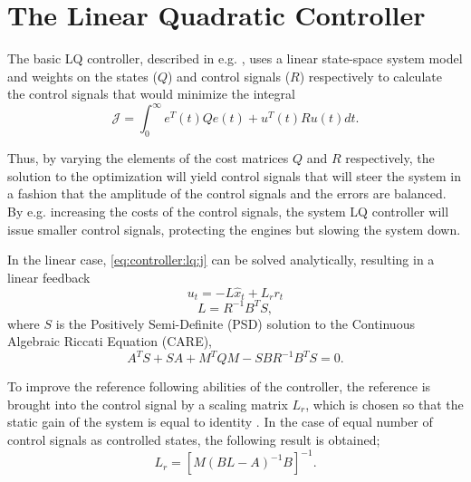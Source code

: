 \section{The Linear Quadratic Controller}
\label{sec:controller:lq}
    The basic LQ controller, described in e.g. \citep{glad2003reglerteori},
    uses a linear state-space system model and weights on the states ($Q$) and control
    signals ($R$) respectively to calculate the control signals that would
    minimize the integral
    \begin{equation}
    \label{eq:controller:lq:j}
        \mathcal{J} = \int_{0}^{\infty} e^{T}(t)Qe(t) + u^{T}(t)Ru(t) dt.
    \end{equation}

    Thus, by varying the elements of the cost matrices $Q$ and $R$
    respectively, the solution to the optimization will yield control
    signals that will steer the system in a fashion that the amplitude
    of the control signals and the errors are balanced.
    By e.g. increasing the costs of the control signals, the system
    LQ controller will issue smaller control signals, protecting the
    engines but slowing the system down.

    In the linear case, \eqref{eq:controller:lq:j} can be solved analytically,
    resulting in a linear feedback
    \begin{equation}
    \label{eq:controller:u}
        u_{t} = -L\hat{x}_{t} + L_{r}r_{t}
    \end{equation}
    \begin{equation}
    \label{eq:controller:L}
        L = R^{-1}B^{T}S,
    \end{equation}
    where $S$ is the Positively Semi-Definite (PSD) solution to the
    Continuous Algebraic Riccati Equation (CARE)\citep{glad2003reglerteori},
    \begin{equation}
        A^{T}S + SA + M^{T}QM - SBR^{-1}B^{T}S = 0.
    \end{equation}

    To improve the reference following abilities of the controller,
    the reference is brought into the control signal by a scaling
    matrix $L_{r}$, which is chosen so that the static gain of the
    system is equal to identity \citep{glad2003reglerteori}.
    In the case of equal number of control signals as controlled
    states, the following result is obtained;
    \begin{equation}
    \label{eq:controller:Lr}
        L_{r} = \left[M(BL - A)^{-1}B\right]^{-1}.
    \end{equation}
